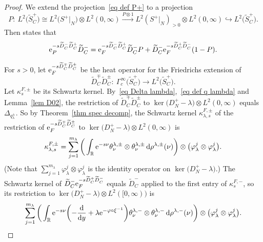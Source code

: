 \documentclass[10pt,a4paper]{amsart}
\numberwithin{equation}{section}
\newcommand{\R}{\mathbb{R}}
\begin{document}
\begin{proof}
We extend the projection~\eqref{eq def P+} to a projection
\[
P \colon\ L^2\big(\widetilde{S}_C^+\big) \cong L^2\big(S^+|_N\big) \otimes L^2(0,\infty)
 \xrightarrow{P \otimes 1} L^2(S^+|_N)_{>0} \otimes L^2 (0,\infty)\hookrightarrow L^2\big(\widetilde{S}_C^+\big).
\]
Then \cite[Proposition~3.5]{HW21a} states that
\begin{equation} \label{eq decomp eP eF}
{\rm e}_P^{-s\widetilde{D}_C^-\widetilde{D}_C^+}\widetilde{D}_C^- = {\rm e}_F^{-s\widetilde{D}_C^-\widetilde{D}_C^+}\widetilde{D}_C^- P + \widetilde{D}_C^-{\rm e}_F^{-s\widetilde{D}_C^+\widetilde{D}_C^-}(1-P).
\end{equation}

 For $s>0$, let ${\rm e}_F^{-s \widetilde{D}_C^{\mp} \widetilde{D}_C^{\pm}}$ be the heat operator for the Friedrichs extension of
\[
\widetilde{D}_C^{\mp} \widetilde{D}_C^{\pm}\colon\ \Gamma^{\infty}_c\big(\widetilde{S}_C^+\big) \to L^2\big(\widetilde{S}_C^+\big).
\]
Let $\kappa_s^{F, \pm}$ be its Schwartz kernel.
By~\eqref{eq Delta lambda},~\eqref{eq def q lambda} and Lemma~\ref{lem D02}, the restriction of $\widetilde{D}_C^{\mp} \widetilde{D}_C^{\pm}$ to $\ker\big(D_N^+ - \lambda\big) \otimes L^2(0,\infty)$ equals $\Delta_{q_{\lambda}^{\pm}}$. So by Theorem~\ref{thm spec decomp}, the Schwartz kernel $\kappa_{\lambda, s}^{F, \pm}$ of the restriction of ${\rm e}_F^{-s \widetilde{D}_C^{\mp} \widetilde{D}_C^{\pm}}$ to $\ker\big(D_N^+ - \lambda\big) \otimes L^2(0, \infty)$ is
\[
\kappa_{\lambda, s}^{F, \pm} =
\sum_{j=1}^{m_{\lambda}}\bigg(\int_{\R}{\rm e}^{-s\nu} \theta^{\lambda, \pm}_{\nu}\otimes \theta^{\lambda, \pm}_{\nu} \, {\rm d}\rho^{\lambda, \pm}(\nu)\bigg) \otimes \big(\varphi_{\lambda}^j \otimes \varphi_{\lambda}^j \big).
\]
\big(Note that $\sum_{j=1}^{m_{\lambda}} \varphi_{\lambda}^j \otimes \varphi_{\lambda}^j$ is the identity operator on $\ker\big(D_N^+ - \lambda\big)$.\big)
The Schwartz kernel of $\widetilde{D}_C^- {\rm e}_F^{-s \widetilde{D}_C^{+}\widetilde{D}_C^-}$ equals $\widetilde{D}_C^-$ applied to the first entry of $\kappa_s^{F, -}$, so its restriction to $\ker\big(D_N^+ - \lambda\big) \otimes L^2([0, \infty))$ is
\begin{equation} \label{eq D kappa F lambda}
\sum_{j=1}^{m_{\lambda}}\bigg(\int_{\R}
{\rm e}^{-s\nu} \biggl( - \frac{\rm d}{{\rm d}y}+\lambda {\rm e}^{-\varphi \circ \xi^{-1}}\biggr) \theta^{\lambda, -}_{\nu}\otimes \theta^{\lambda, -}_{\nu} \, {\rm d}\rho^{\lambda, -}(\nu)\bigg) \otimes \big(\varphi_{\lambda}^j \otimes \varphi_{\lambda}^j \big).

\end{equation}
\end{proof}
\end{document}
